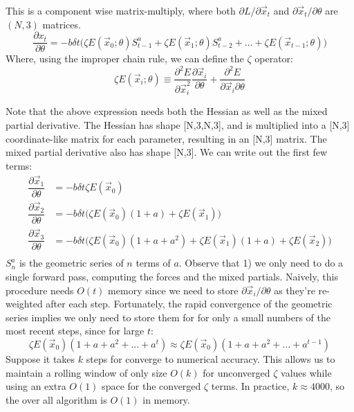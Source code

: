 \documentclass{article}
\begin{document}
This is a component wise matrix-multiply, where both $\partial L / \partial \vec{x}_t$ and ${\partial \vec{x}_t}/{\partial \theta}$ are $(N, 3)$ matrices.
\begin{equation}
\dfrac {\partial x_t}{\partial \theta} = -b  \delta t \Big( \zeta E(\vec{x}_0; \theta)S_{t-1}^a + \zeta E(\vec{x}_1;\theta)S_{t-2}^a + \ldots +  \zeta E(\vec{x}_{t-1};\theta) \Big)
\end{equation}
Where, using the improper chain rule, we can define the $\zeta$ operator:
\begin{equation}
\zeta E(\vec{x}_i; \theta) \equiv \dfrac{\partial^2E}{\partial\vec{x}_i^2}\dfrac{\partial\vec{x}_i}{\partial\theta} +  \dfrac{\partial^2 E}{\partial \vec{x}_i \partial \theta} 
\end{equation}

Note that the above expression needs both the Hessian as well as the mixed partial derivative. The Hessian has shape [N,3,N,3], and is multiplied into a [N,3] coordinate-like matrix for each parameter, resulting in an [N,3] matrix. The mixed partial derivative also has shape [N,3]. We can write out the first few terms:
\begin{equation}
\begin{split}
\dfrac{\partial\vec{x}_1}{\partial\theta}  &= - b\delta t \zeta E(\vec{x}_0) \\
\dfrac{\partial\vec{x}_2}{\partial\theta}  &= - b\delta t \Big(\zeta E(\vec{x}_0)(1+a)+\zeta E(\vec{x}_1)\Big)\\
\dfrac{\partial\vec{x}_3}{\partial\theta}  &= - b\delta t \Big(\zeta E(\vec{x}_0)(1+a+a^2)+\zeta E(\vec{x}_1)(1+a)+\zeta E(\vec{x}_2)\Big)\\
\end{split}
\end{equation}
$S_n^a$ is the geometric series of $n$ terms of $a$. Observe that 1) we only need to do a single forward pass, computing the forces and the mixed partials. Naively, this procedure needs $O(t)$ memory since we need to store $\partial\vec{x}_i / \partial\theta$ as they're re-weighted after each step. Fortunately, the rapid convergence of the geometric series implies we only need to store them for for only a small numbers of the most recent steps, since for large $t$:
\begin{equation}
\zeta E(\vec{x}_0)(1+a+a^2+...+a^t) \approx \zeta E(\vec{x}_0)(1+a+a^2+...+a^{t-1})
\end{equation}
Suppose it takes $k$ steps for converge to numerical accuracy. This allows us to maintain a rolling window of only size $O(k)$ for unconverged $\zeta$ values while using an extra $O(1)$ space for the converged $\zeta$ terms. In practice, $k \approx 4000$, so the over all algorithm is $O(1)$ in memory.
\end{document}
